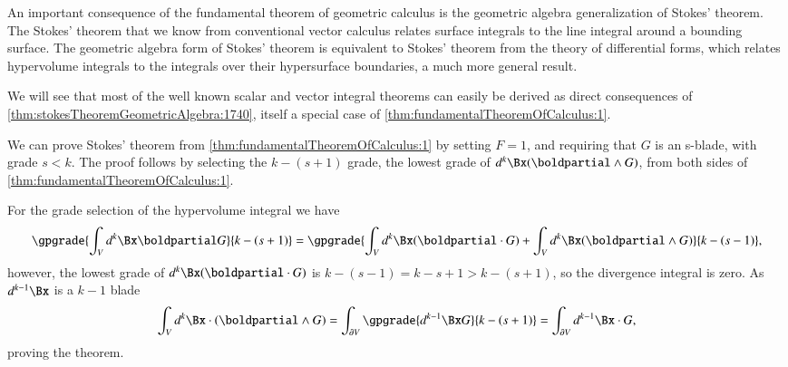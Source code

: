 %
%
An important consequence of the fundamental theorem of geometric calculus is the
geometric algebra generalization of Stokes' theorem.
The Stokes' theorem that we know from conventional vector calculus relates
 surface integrals to the line integral around a bounding surface.
The geometric algebra form of Stokes' theorem is equivalent to Stokes' theorem from the theory of differential forms, which relates
hypervolume integrals to the integrals over their hypersurface boundaries, a much more general result.


We will see that most of the well known scalar and vector integral theorems can easily be derived as direct consequences of \cref{thm:stokesTheoremGeometricAlgebra:1740}, itself a special case of \cref{thm:fundamentalTheoremOfCalculus:1}.

We can prove Stokes' theorem
from \cref{thm:fundamentalTheoremOfCalculus:1}
by setting \( F = 1 \), and requiring that \( G \)
is an s-blade, with grade \( s < k \).
The proof follows by selecting the \( k-(s+1) \) grade, the lowest grade of \( d^k \Bx (\boldpartial \wedge G) \), from both sides of \cref{thm:fundamentalTheoremOfCalculus:1}.

For the grade selection of the hypervolume integral we have
\begin{dmath}\label{eqn:stokesTheoremTheStatement:100}
\gpgrade{ \int_V d^k \Bx \boldpartial G }{k-(s+1)}
=
\gpgrade{
\int_V d^k \Bx (\boldpartial \cdot G )
+
\int_V d^k \Bx (\boldpartial \wedge G )
}{k-(s-1)},
\end{dmath}
however, the lowest grade of \( d^k \Bx (\boldpartial \cdot G ) \) is \( k -(s-1) = k - s + 1 > k - (s+1) \), so the divergence integral is zero.  As \( d^{k-1} \Bx \) is a \( k - 1 \) blade
\begin{dmath}\label{eqn:stokesTheoremTheStatement:110}
\int_V d^k \Bx \cdot (\boldpartial \wedge G )
= \int_{\partial V} \gpgrade{d^{k-1} \Bx G}{k-(s+1)}
= \int_{\partial V} d^{k-1} \Bx \cdot G,
\end{dmath}
proving the theorem.
